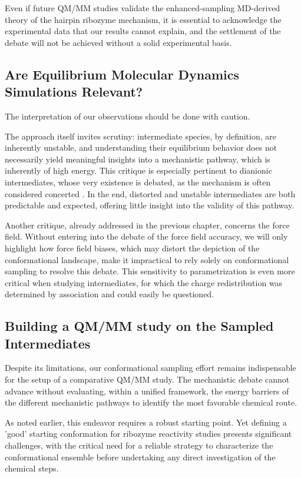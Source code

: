 \documentclass[journal=jacsat,manuscript=article]{achemso}
\begin{document}
Even if future QM/MM studies validate the enhanced-sampling MD-derived theory of the hairpin ribozyme mechanism,
it is essential to acknowledge the experimental data that our results cannot explain, 
and the settlement of the debate will not be achieved without a solid experimental basis.

\subsection{Are Equilibrium Molecular Dynamics Simulations Relevant?}

The interpretation of our observations should be done with caution.

The approach itself invites scrutiny: intermediate species, by definition, are inherently unstable,
and understanding their equilibrium behavior does not necessarily yield meaningful insights into a mechanistic pathway,
which is inherently of high energy.
This critique is especially pertinent to dianionic intermediates,
whose very existence is debated, as the mechanism is often considered concerted \cite{mlynsky_comparison_2014,mlynsky_qmmm_2011,nam_electrostatic_2008}.
In the end, distorted and unstable intermediates are both predictable and expected,
offering little insight into the validity of this pathway.

Another critique, already addressed in the previous chapter, concerns the force field.
Without entering into the debate of the force field accuracy, we will only highlight how force field biases, 
which may distort the depiction of the conformational landscape,
make it impractical to rely solely on conformational sampling to resolve this debate.
This sensitivity to parametrization is even more critical when studying intermediates,
for which the charge redistribution was determined by association and could easily be questioned.


\subsection{Building a QM/MM study on the Sampled Intermediates}

Despite its limitations, our conformational sampling effort remains indispensable for the setup of a comparative QM/MM study.
The mechanistic debate cannot advance without evaluating, within a unified framework,
the energy barriers of the different mechanistic pathways to identify the most favorable chemical route.

As noted earlier, this endeavor requires a robust starting point.
Yet defining a 'good' starting conformation for ribozyme reactivity studies presents significant challenges,
with the critical need for a reliable strategy
to characterize the conformational ensemble before undertaking any direct investigation of the chemical steps.
\end{document}
